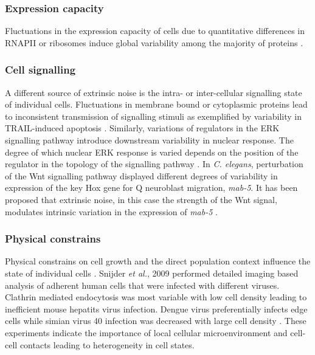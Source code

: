 \subsubsection{Expression capacity}

Fluctuations in the expression capacity of cells due to quantitative differences in RNAPII or ribosomes induce global variability among the majority of proteins \citep{Colman-Lerner2005a}.

\subsubsection{Cell signalling}

A different source of extrinsic noise is the intra- or inter-cellular signalling state of individual cells. Fluctuations in membrane bound or cytoplasmic proteins lead to inconsistent transmission of signalling stimuli as exemplified by variability in TRAIL-induced apoptosis \citep{Spencer2009}. Similarly, variations of regulators in the \gls{ERK} signalling pathway introduce downstream variability in nuclear response. The degree of which nuclear ERK response is varied depends on the position of the regulator in the topology of the signalling pathway \citep{Iwamoto2016}. In \textit{C. elegans}, perturbation of the Wnt signalling pathway displayed different degrees of variability in expression of the key Hox gene for Q neuroblast migration, \textit{mab-5}. It has been proposed that extrinsic noise, in this case the strength of the Wnt signal, modulates intrinsic variation in the expression of \textit{mab-5} \citep{Ji2013}. 

\subsubsection{Physical constrains}

Physical constrains on cell growth and the direct population context influence the state of individual cells \citep{Battich2015a}. Snijder \textit{et al.}, 2009 performed detailed imaging based analysis of adherent human cells that were infected with different viruses. Clathrin mediated endocytosis was most variable with low cell density leading to inefficient mouse hepatits virus infection. Dengue virus preferentially infects edge cells while simian virus 40 infection was decreased with large cell density \citep{Snijder2009}. These experiments indicate the importance of local cellular microenvironment and cell-cell contacts leading to heterogeneity in cell states. 

